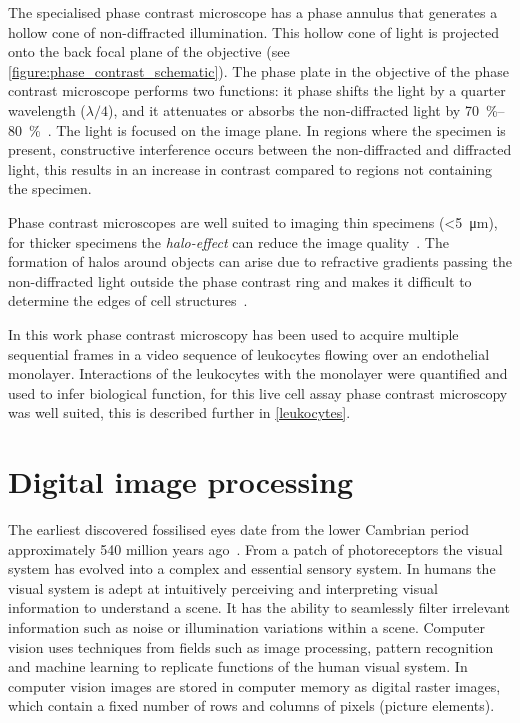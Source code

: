 The specialised phase contrast microscope has a phase annulus that generates a hollow cone of non-diffracted illumination. This hollow cone of light is projected onto the back focal plane of the objective (see \autoref{figure:phase_contrast_schematic}). The phase plate in the objective of the phase contrast microscope performs two functions: it phase shifts the light by a quarter wavelength ($\lambda/4$), and it attenuates or absorbs the non-diffracted light by \SIrange{70}{80}{\percent}~\cite{Spector2006}. The light is focused on the image plane. In regions where the specimen is present, constructive interference occurs between the non-diffracted and diffracted light, this results in an increase in contrast compared to regions not containing the specimen.

Phase contrast microscopes are well suited to imaging thin specimens (\textless \SI{5}{\micro\meter}), for thicker specimens the \emph{halo-effect} can reduce the image quality~\cite{Spector2006}. The formation of halos around objects can arise due to refractive gradients passing the non-diffracted light outside the phase contrast ring and makes it difficult to determine the edges of cell structures~\cite{Otaki2000}.

In this work phase contrast microscopy has been used to acquire multiple sequential frames in a video sequence of leukocytes flowing over an endothelial monolayer. Interactions of the leukocytes with the monolayer were quantified and used to infer biological function, for this live cell assay phase contrast microscopy was well suited, this is described further in \autoref{leukocytes}.

\section{Digital image processing}
\label{introduction:image_processing}
The earliest discovered fossilised eyes date from the lower Cambrian period approximately 540 million years ago~\cite{Parker2011}. From a patch of photoreceptors the visual system has evolved into a complex and essential sensory system. In humans the visual system is adept at intuitively perceiving and interpreting visual information to understand a scene. It has the ability to seamlessly filter irrelevant information such as noise or illumination variations within a scene. Computer vision uses techniques from fields such as image processing, pattern recognition and machine learning to replicate functions of the human visual system. In computer vision images are stored in computer memory as digital raster images, which contain a fixed number of rows and columns of pixels (picture elements).

